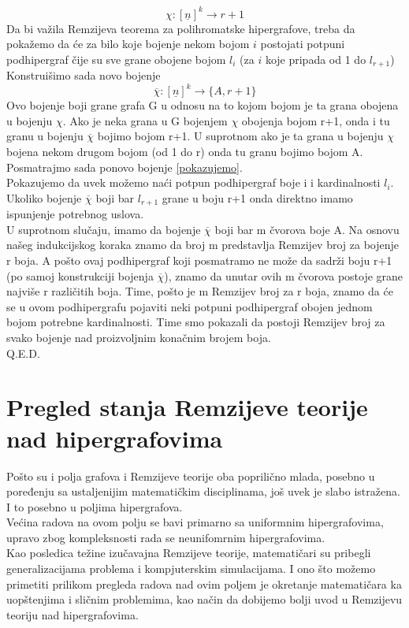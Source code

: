 \documentclass[a4paper]{article}
\begin{document}
\begin{description}
		\begin{equation}\label{pokazujemo}
		\chi : [\underline{n}]^k \rightarrow r+1
		\end{equation}
		Da bi važila Remzijeva teorema za polihromatske hipergrafove, treba da pokažemo da će za bilo koje bojenje nekom bojom $i$ postojati potpuni podhipergraf čije su sve grane obojene bojom $l_i$ (za $i$ koje pripada od 1 do $l_{r+1}$) %
		Konstruišimo sada novo bojenje 
		\begin{equation}
			\overline{\chi} : [\underline{n}]^k \rightarrow \{A, r+1\}
		\end{equation}
		Ovo bojenje  boji grane grafa G u odnosu na to kojom bojom je ta grana obojena u bojenju $\chi$. Ako je neka grana u G bojenjem $\chi$ obojenja bojom r+1, onda i tu granu u bojenju $\overline{\chi}$ bojimo bojom r+1. U suprotnom ako je ta grana u bojenju $\chi$ bojena nekom drugom bojom (od 1 do r) onda tu granu bojimo bojom A.\\
		Posmatrajmo sada ponovo bojenje \ref{pokazujemo}.\\
		Pokazujemo da uvek možemo naći potpun podhipergraf boje i i kardinalnosti $l_i$.
		Ukoliko bojenje $\overline{\chi}$ boji bar $l_{r+1}$ grane u boju r+1 onda direktno imamo ispunjenje potrebnog uslova.
		\\
		U suprotnom slučaju, imamo da bojenje $\overline{\chi}$ boji bar m čvorova boje A. Na osnovu našeg indukcijskog koraka znamo da broj m predstavlja Remzijev broj za bojenje r boja. A pošto ovaj podhipergraf koji posmatramo ne može da sadrži boju r+1 (po samoj konstrukciji bojenja $\overline{\chi}$), znamo da unutar ovih m čvorova postoje grane najviše r različitih boja. Time, pošto je m Remzijev broj za r boja, znamo da će se u ovom podhipergrafu pojaviti neki potpuni podhipergraf obojen jednom bojom potrebne kardinalnosti. Time smo pokazali da postoji Remzijev broj za svako bojenje nad proizvoljnim konačnim brojem boja. \\
		Q.E.D.
 	\end{description}
	\section{Pregled stanja Remzijeve teorije nad hipergrafovima}
	Pošto su i polja grafova i Remzijeve teorije oba poprilično mlada, posebno u poređenju sa ustaljenijim matematičkim disciplinama, još uvek je slabo istražena. I to posebno u poljima hipergrafova.\\ Većina radova na ovom polju se bavi primarno sa uniformnim hipergrafovima, upravo zbog kompleksnosti rada se neunifomrnim hipergrafovima.\\ Kao posledica težine izučavajna Remzijeve teorije, matematičari su pribegli generalizacijama problema i kompjuterskim simulacijama. I ono što možemo primetiti prilikom pregleda radova nad ovim poljem je okretanje matematičara ka uopštenjima i sličnim problemima, kao način da dobijemo bolji uvod u Remzijevu teoriju nad hipergrafovima.
\end{document}
